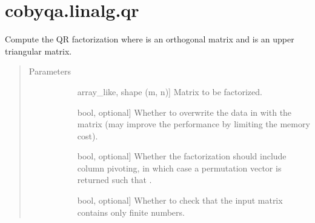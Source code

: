 \documentclass[letterpaper,10pt,english]{sphinxmanual}
\begin{document}
\section{cobyqa.linalg.qr}
\label{\detokenize{refs/generated/cobyqa.linalg.qr:cobyqa-linalg-qr}}\label{\detokenize{refs/generated/cobyqa.linalg.qr::doc}}

\begin{fulllineitems}
\label{\detokenize{refs/generated/cobyqa.linalg.qr:cobyqa.linalg.qr}}
\sphinxAtStartPar
Compute the QR factorization  where  is an orthogonal
matrix and  is an upper triangular matrix.
\begin{quote}\begin{description}
\item[{Parameters}] \leavevmode\begin{description}
\item[{}] \leavevmode{[}array\_like, shape (m, n){]}
\sphinxAtStartPar
Matrix to be factorized.

\item[{}] \leavevmode{[}bool, optional{]}
\sphinxAtStartPar
Whether to overwrite the data in  with the matrix  (may improve
the performance by limiting the memory cost).

\item[{}] \leavevmode{[}bool, optional{]}
\sphinxAtStartPar
Whether the factorization should include column pivoting, in which case
a permutation vector  is returned such that .

\item[{}] \leavevmode{[}bool, optional{]}
\sphinxAtStartPar
Whether to check that the input matrix contains only finite numbers.

\end{description}


\end{description}
\end{quote}
\end{fulllineitems}
\end{document}
